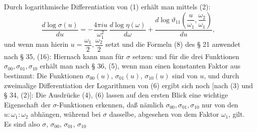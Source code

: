 
Durch logarithmische Differentiation von (1) erhält man mittels (2):
\[
\frac{d\log\sigma(u)}{du} = -\frac{4\pi i u}{\omega_1^2}\,\frac{d\log\eta(\omega)}{d\omega} + \frac{d\log\vartheta_{11}\left(\dfrac{u}{\omega_1},\dfrac{\omega_2}{\omega_1}\right)}{du},
\]
und wenn man hierin $u = \dfrac{\omega_1}{2}, \dfrac{\omega_2}{2}$ setzt und die Formeln (8) des § 21 anwendet nach § 35, (16):
Hiernach kann man für $\sigma$ setzen:
und für die drei Funktionen $\sigma_{00}, \sigma_{01}, \sigma_{10}$ erhält man nach § 36, (5), wenn man einen konstanten Faktor aus
bestimmt:
Die Funktionen $\sigma_{00}(u)$, $\sigma_{01}(u)$, $\sigma_{10}(u)$ sind  von $u$, und durch zweimalige Differentiation der Logarithmen von (6) ergibt sich noch [nach (3) und § 34, (2)]:
Die Ausdrücke (4), (6) lassen auf den ersten Blick eine wichtige Eigenschaft der $\sigma$-Funktionen erkennen, daß nämlich $\sigma_{00}, \sigma_{01}, \sigma_{10}$ nur von den  $u:\omega_1:\omega_2$ abhängen, während bei $\sigma$ dasselbe, abgesehen von dem Faktor $\omega_1$, gilt. Es sind also $\sigma$, $\sigma_{00}$, $\sigma_{01}$, $\sigma_{10}$ 
